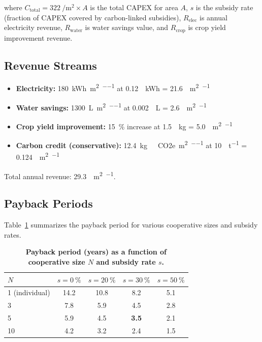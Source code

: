 \documentclass[11pt,a4paper]{article}
\begin{document}
where $C_{\mathrm{total}} = \SI{322}{\per\m\squared} \times A$ is the total CAPEX for area $A$, $s$ is the subsidy rate (fraction of CAPEX covered by carbon-linked subsidies), $R_{\mathrm{elec}}$ is annual electricity revenue, $R_{\mathrm{water}}$ is water savings value, and $R_{\mathrm{crop}}$ is crop yield improvement revenue.

\subsection{Revenue Streams}

\begin{itemize}
\item \textbf{Electricity:} \SI{180}{\kWh\per\m\squared\per\yr} at \SI{0.12}{\per\kWh} = \SI{21.6}{\per\m\squared\per\yr}
\item \textbf{Water savings:} \SI{1300}{\L\per\m\squared\per\yr} at \SI{0.002}{\per\L} = \SI{2.6}{\per\m\squared\per\yr}
\item \textbf{Crop yield improvement:} \SI{15}{\percent} increase at \SI{1.5}{\per\kg} = \SI{5.0}{\per\m\squared\per\yr}
\item \textbf{Carbon credit (conservative):} \SI{12.4}{\kg\ CO2e\per\m\squared\per\yr} at \SI{10}{\USD\per\tonne} = \SI{0.124}{\per\m\squared\per\yr}
\end{itemize}
Total annual revenue: \SI{29.3}{\per\m\squared\per\yr}.

\subsection{Payback Periods}

Table~\ref{tab:SI_payback} summarizes the payback period for various cooperative sizes and subsidy rates.

\begin{table}[htbp]
\centering
\caption{\textbf{Payback period (years) as a function of cooperative size $N$ and subsidy rate $s$.}}
\label{tab:SI_payback}
\begin{tabular}{lcccc}
\toprule
$N$ & $s = \SI{0}{\percent}$ & $s = \SI{20}{\percent}$ & $s = \SI{30}{\percent}$ & $s = \SI{50}{\percent}$ \\
\midrule
1 (individual) & 14.2 & 10.8 & 8.2 & 5.1 \\
3 & 7.8 & 5.9 & 4.5 & 2.8 \\
5 & 5.9 & 4.5 & \textbf{3.5} & 2.1 \\
10 & 4.2 & 3.2 & 2.4 & 1.5 \\
\bottomrule
\end{tabular}
\end{table}
\end{document}
